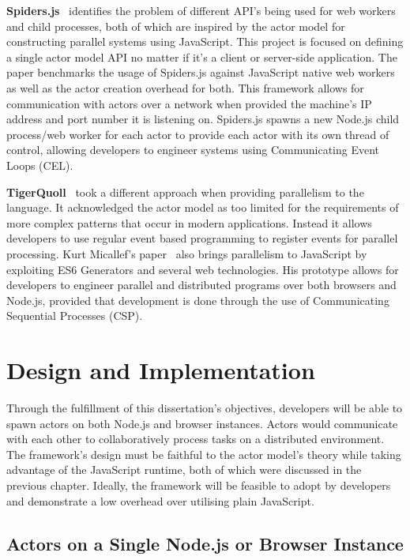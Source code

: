 \documentclass[lettersize,journal]{IEEEtran}
\begin{document}
\textbf{Spiders.js}~\cite{spidersjs} identifies the problem of different API's being used for web workers and child processes, both of which are inspired by the actor model for constructing parallel systems using JavaScript. This project is focused on defining a single actor model API no matter if it's a client or server-side application. The paper benchmarks the usage of Spiders.js against JavaScript native web workers as well as the actor creation overhead for both. This framework allows for communication with actors over a network when provided the machine's IP address and port number it is listening on. Spiders.js spawns a new Node.js child process/web worker for each actor to provide each actor with its own thread of control, allowing developers to engineer systems using Communicating Event Loops (CEL).

\textbf{TigerQuoll}~\cite{tigerquoll} took a different approach when providing parallelism to the language. It acknowledged the actor model as too limited for the requirements of more complex patterns that occur in modern applications. Instead it allows developers to use regular event based programming to register events for parallel processing. Kurt Micallef's paper~\cite{kurt} also brings parallelism to JavaScript by exploiting ES6 Generators and several web technologies. His prototype allows for developers to engineer parallel and distributed programs over both browsers and Node.js, provided that development is done through the use of Communicating Sequential Processes (CSP).
\section{Design and Implementation}
Through the fulfillment of this dissertation's objectives, developers will be able to spawn actors on both Node.js and browser instances. Actors would communicate with each other to collaboratively process tasks on a distributed environment. The framework’s design must be faithful to the actor model’s theory while taking advantage of the JavaScript runtime, both of which were discussed in the previous chapter. Ideally, the framework will be feasible to adopt by developers and demonstrate a low overhead over utilising plain JavaScript.

\subsection{Actors on a Single Node.js or Browser Instance}
\end{document}
